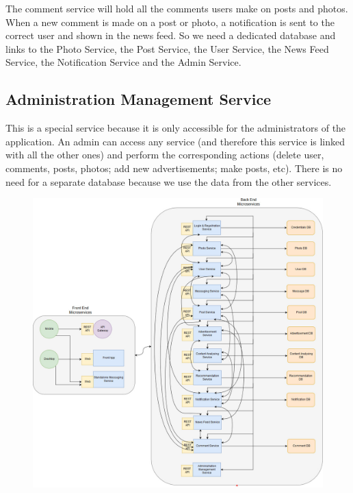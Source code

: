 \documentclass[a4paper,12pt]{article}
\begin{document}
The comment service will hold all the comments users make on posts and photos. When a new comment is made on a post or photo, a notification is sent to the correct user and shown in the news feed. So we need a dedicated database and links to the Photo Service, the Post Service, the User Service, the News Feed Service, the Notification Service and the Admin Service. 

\subsection{Administration Management Service}

This is a special service because it is only accessible for the administrators of the application. An admin can access any service (and therefore this service is linked with all the other ones) and perform the corresponding actions (delete user, comments, posts, photos; add new advertisements; make posts, etc). There is no need for a separate database because we use the data from the other services.

\newpage

\begin{figure}
  \includegraphics[width=\linewidth]{architectureSchema.jpg}
\end{figure}
\end{document}
